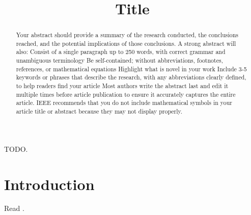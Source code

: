 
\title{Title}

\begin{abstract}
Your abstract should provide a summary of the research conducted, the conclusions reached, and the potential implications of those conclusions. A strong abstract will also: Consist of a single paragraph up to 250 words, with correct grammar and unambiguous terminology Be self-contained; without abbreviations, footnotes, references, or mathematical equations Highlight what is novel in your work Include 3-5 keywords or phrases that describe the research, with any abbreviations clearly defined, to help readers find your article Most authors write the abstract last and edit it multiple times before article publication to ensure it accurately captures the entire article. IEEE recommends that you do not include mathematical symbols in your article title or abstract because they may not display properly.

\end{abstract}

\begin{IEEEkeywords}
TODO.
\end{IEEEkeywords}

\acresetall


\section{Introduction}
\label{introduction}

Read \cite{ieee_author_center_structure_article_2025}.

